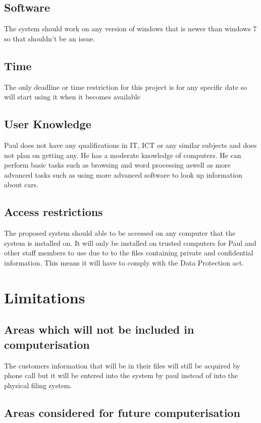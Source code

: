 	

	\subsection{Software}
	The system should work on any version of windows that is newer than windows 7 so that shouldn't be an issue.	


	\subsection{Time}
	
	The only deadline or time restriction for this project is for any specific date so will start using it when it becomes available

	\subsection{User Knowledge}
	Paul does not have any qualifications in IT, ICT or any similar subjects and does not plan on getting any. He has a moderate knowledge of computers. He can perform basic tasks such as browsing and word processing aswell as more advanced tasks such as using more advanced software to look up information about cars.

	\subsection{Access restrictions}
	
	The proposed system should able to be accessed on any computer that the system is installed on. It will only be installed on trusted computers for Paul and other staff members to use due to to the files containing private and confidential information. This means it will have to comply with the Data Protection act.

\section{Limitations}

	\subsection{Areas which will not be included in computerisation}
	The customers information that will be in their files will still be acquired by phone call but it will be entered into the system by paul instead of into the physical filing system.

	\subsection{Areas considered for future computerisation}
	
